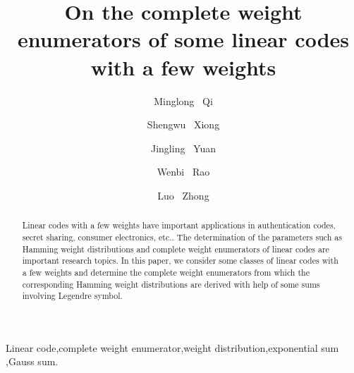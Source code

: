 \documentclass[final,1p,times]{elsarticle}
\begin{document}
\begin{frontmatter}



\title{On the complete weight enumerators of some linear codes with a few weights}


\author[whut]{Minglong ~Qi}
\author[whut]{Shengwu ~Xiong}
\author[whut]{Jingling ~Yuan}
\author[whut]{Wenbi ~Rao}
\author[whut]{Luo ~Zhong}
\address[whut]{School of Computer Science and Technology,  Wuhan University of Technology, Mafangshan West Campus, 430070 Wuhan City, China}

\begin{abstract}
Linear codes with a few weights have important applications in authentication codes, secret sharing, consumer electronics, etc.. The determination of the parameters such as Hamming weight distributions and complete weight enumerators of linear codes are  important research topics. 
In this paper, we consider  some classes of linear codes with a few weights and determine the complete weight enumerators from which the corresponding Hamming weight distributions are derived with help of some sums involving  Legendre symbol. 
\end{abstract}

\begin{keyword}
Linear code\sep complete weight enumerator\sep weight distribution\sep exponential sum \sep Gauss sum.


\end{keyword}

\end{frontmatter}
\end{document}
